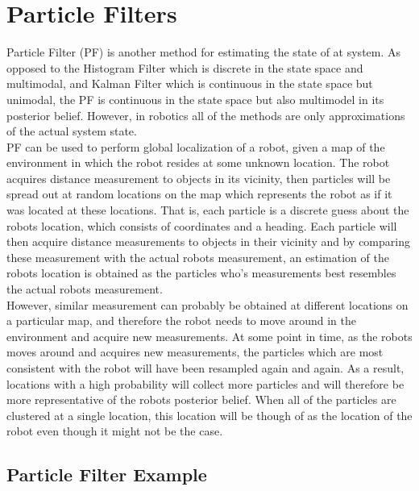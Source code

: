 
\section{Particle Filters}

Particle Filter (PF) is another method for estimating the state of at system. As opposed to the Histogram Filter which is discrete in the state space and multimodal, and Kalman Filter which is continuous in the state space but unimodal, the PF is continuous in the state space but also multimodel in its posterior belief. However, in robotics all of the methods are only approximations of the actual system state.\\

PF can be used to perform global localization of a robot, given a map of the environment in which the robot resides at some unknown location. The robot acquires distance measurement to objects in its vicinity, then particles will be spread out at random locations on the map which represents the robot as if it was located at these locations. That is, each particle is a discrete guess about the robots location, which consists of coordinates and a heading. Each particle will then acquire distance measurements to objects in their vicinity and by comparing these measurement with the actual robots measurement, an estimation of the robots location is obtained as the particles who's measurements best resembles the actual robots measurement.\\

However, similar measurement can probably be obtained at different locations on a particular map, and therefore the robot needs to move around in the environment and acquire new measurements. At some point in time, as the robots moves around and acquires new measurements, the particles which are most consistent with the robot will have been resampled again and again. As a result, locations with a high probability will collect more particles and will therefore be more representative of the robots posterior belief. When all of the particles are clustered at a single location, this location will be though of as the location of the robot even though it might not be the case.\\

\subsection{Particle Filter Example}

